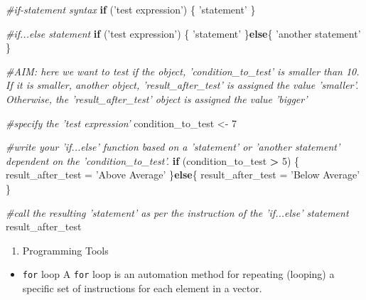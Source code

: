 \documentclass[]{book}
\newenvironment{Shaded}{\begin{snugshade}}{\end{snugshade}}
\newcommand{\CommentTok}[1]{\textcolor[rgb]{0.56,0.35,0.01}{\textit{#1}}}
\newcommand{\ControlFlowTok}[1]{\textcolor[rgb]{0.13,0.29,0.53}{\textbf{#1}}}
\newcommand{\DecValTok}[1]{\textcolor[rgb]{0.00,0.00,0.81}{#1}}
\newcommand{\NormalTok}[1]{#1}
\newcommand{\OperatorTok}[1]{\textcolor[rgb]{0.81,0.36,0.00}{\textbf{#1}}}
\newcommand{\StringTok}[1]{\textcolor[rgb]{0.31,0.60,0.02}{#1}}
\providecommand{\tightlist}{%
  \setlength{\itemsep}{0pt}\setlength{\parskip}{0pt}}
\begin{document}
\begin{Shaded}
\begin{Highlighting}[]
\CommentTok{#if-statement syntax}
\ControlFlowTok{if}\NormalTok{ (}\StringTok{'test expression'}\NormalTok{)}
\NormalTok{    \{}
    \StringTok{'statement'}
\NormalTok{    \}}

\CommentTok{#if...else statement}
\ControlFlowTok{if}\NormalTok{ (}\StringTok{'test expression'}\NormalTok{)}
\NormalTok{    \{}
    \StringTok{'statement'}
\NormalTok{    \}}\ControlFlowTok{else}\NormalTok{\{}
    \StringTok{'another statement'}
\NormalTok{    \}}

\CommentTok{#AIM: here we want to test if the object, 'condition_to_test' is smaller than 10. If it is smaller, another object, 'result_after_test' is assigned the value 'smaller'. Otherwise, the 'result_after_test' object is assigned the value 'bigger'}

\CommentTok{#specify the 'test expression'}
\NormalTok{condition_to_test <-}\StringTok{ }\DecValTok{7} 

\CommentTok{#write your 'if...else' function based on a 'statement' or 'another statement' dependent on the 'condition_to_test'. }
\ControlFlowTok{if}\NormalTok{ (condition_to_test }\OperatorTok{>}\StringTok{ }\DecValTok{5}\NormalTok{)}
\NormalTok{    \{}
\NormalTok{    result_after_test =}\StringTok{ 'Above Average'}
\NormalTok{    \}}\ControlFlowTok{else}\NormalTok{\{}
\NormalTok{    result_after_test =}\StringTok{ 'Below Average'}
\NormalTok{    \}}

\CommentTok{#call the resulting 'statement' as per the instruction of the 'if...else' statement}
\NormalTok{result_after_test }
\end{Highlighting}
\end{Shaded}

\begin{enumerate}
\def\labelenumi{\arabic{enumi}.}
\setcounter{enumi}{20}
\tightlist
\item
  Programming Tools
\end{enumerate}

\begin{itemize}
\tightlist
\item
  \texttt{for} loop
  A \texttt{for} loop is an automation method for repeating (looping) a specific set of instructions for each element in a vector.
\end{itemize}
\end{document}
